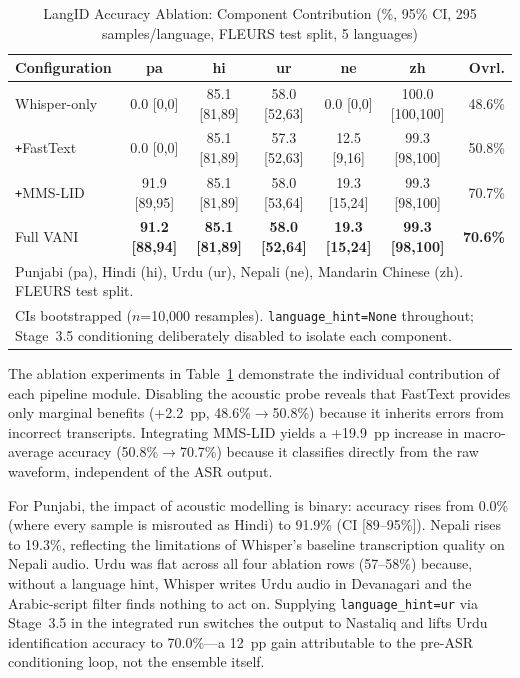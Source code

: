 \documentclass[conference]{IEEEtran}
\begin{document}
\begin{table}[htbp]
\caption{LangID Accuracy Ablation: Component Contribution (\%, 95\% CI, 295 samples/language, FLEURS test split, 5 languages)}
\label{tab:ablation}
\begin{center}
\scriptsize
\begin{tabular}{lcccccr}
\toprule
\textbf{Configuration} & \textbf{pa} & \textbf{hi} & \textbf{ur} & \textbf{ne} & \textbf{zh} & \textbf{Ovrl.} \\
\midrule
Whisper-only & 0.0 [0,0] & 85.1 [81,89] & 58.0 [52,63] & 0.0 [0,0] & 100.0 [100,100] & 48.6\% \\
\texttt{+}FastText & 0.0 [0,0] & 85.1 [81,89] & 57.3 [52,63] & 12.5 [9,16] & 99.3 [98,100] & 50.8\% \\
\texttt{+}MMS-LID & 91.9 [89,95] & 85.1 [81,89] & 58.0 [53,64] & 19.3 [15,24] & 99.3 [98,100] & 70.7\% \\
Full VANI & \textbf{91.2 [88,94]} & \textbf{85.1 [81,89]} & \textbf{58.0 [52,64]} & \textbf{19.3 [15,24]} & \textbf{99.3 [98,100]} & \textbf{70.6\%} \\
\midrule
\multicolumn{7}{l}{\footnotesize Punjabi (pa), Hindi (hi), Urdu (ur), Nepali (ne), Mandarin Chinese (zh). FLEURS test split.} \\
\multicolumn{7}{l}{\footnotesize CIs bootstrapped ($n$=10{,}000 resamples). \texttt{language\_hint=None} throughout; Stage~3.5 conditioning deliberately disabled to isolate each component.} \\
\bottomrule
\end{tabular}
\end{center}
\end{table}

The ablation experiments in Table~\ref{tab:ablation} demonstrate the individual contribution of each pipeline module. Disabling the acoustic probe reveals that FastText provides only marginal benefits (+2.2~pp, 48.6\%$\rightarrow$50.8\%) because it inherits errors from incorrect transcripts. Integrating MMS-LID yields a +19.9~pp increase in macro-average accuracy (50.8\%$\rightarrow$70.7\%) because it classifies directly from the raw waveform, independent of the ASR output.

For Punjabi, the impact of acoustic modelling is binary: accuracy rises from 0.0\% (where every sample is misrouted as Hindi) to 91.9\% (CI [89--95\%]). Nepali rises to 19.3\%, reflecting the limitations of Whisper's baseline transcription quality on Nepali audio. Urdu was flat across all four ablation rows (57--58\%) because, without a language hint, Whisper writes Urdu audio in Devanagari and the Arabic-script filter finds nothing to act on. Supplying \texttt{language\_hint=ur} via Stage~3.5 in the integrated run switches the output to Nastaliq and lifts Urdu identification accuracy to 70.0\%---a 12~pp gain attributable to the pre-ASR conditioning loop, not the ensemble itself.
\end{document}

